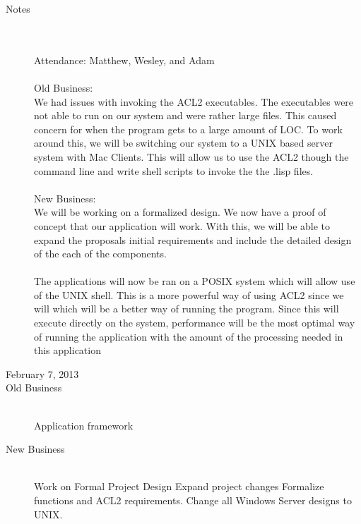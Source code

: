 \documentclass[11pt, letterpaper]{report}
\begin{document}
\begin{description}
\item[Notes] \hfill \\ \hfill \\
Attendance:  Matthew, Wesley, and Adam\\ \\
Old Business: \\ 
We had issues with invoking the ACL2 executables. The executables were not able to run on our system and were rather large files. This caused concern for when the program gets to a large amount of LOC. To work around this, we will be switching our system to a UNIX based server system with Mac Clients. This will allow us to use the ACL2 though the command line and write shell scripts to invoke the the .lisp files. 
\\ \\
New Business: \\ 
We will be working on a formalized design. We now have a proof of concept that our application will work. With this, we will be able to expand the proposals initial requirements and include the detailed design of the each of the components. \\ \\
The applications will now be ran on a POSIX system which will allow use of the UNIX shell. This is a more powerful way of using ACL2 since we will which will be a better way of running the program. Since this will execute directly on the system, performance will be the most optimal way of running the application with the amount of the processing needed in this application

\newpage
\item[\Large February 7, 2013]
\hypertarget{February 7, 2013} {}
\item[Old Business] \hfill \\
\subitem Application framework
\item[New Business] \hfill \\
\subitem Work on Formal Project Design 
\subsubitem Expand project changes
\subsubitem Formalize functions and ACL2 requirements.
\subsubitem Change all Windows Server designs to UNIX.


\end{description}
\end{document}
